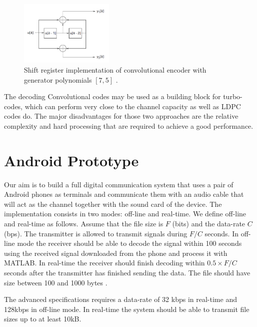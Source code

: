 \documentclass[12pt,a4paper,openright]{report}
\begin{document}
 
  \begin{figure}[H]
   \centering
     \includegraphics[width=0.4\textwidth]{convCode.PNG}
     \caption[Shift register implementation of convolutional encoder]{Shift register implementation of convolutional encoder with generator polynomials $[7,5]$ \cite{Madhow}.}
     \label{fig:convCodeImp}
 \end{figure}  
 
 The decoding 
 Convolutional codes may be used as a building block for turbo-codes, which can perform very close to the channel capacity as well as LDPC codes do. The major disadvantages for those two approaches are the relative complexity and hard processing that are required to achieve a good performance. 





\chapter{Android Prototype}

Our aim is to build a full digital communication system that uses a pair of Android phones as terminals and communicate them with an audio cable that will act as the channel together with the sound card of the device. The implementation consists in two modes: off-line and real-time. We define off-line and real-time as follows. Assume that the file size is $F$ (bits) and the data-rate $C$ (bps). The transmitter is allowed to transmit signals during $F/C$ seconds. In off-line mode the receiver should be able to decode the signal within 100 seconds using the received signal downloaded from the phone and process it with MATLAB. In real-time the receiver should finish decoding within $0.5\times F/C$ seconds after the transmitter has finished sending the data. The file should have size between 100 and 1000 bytes \cite{EQ2440ProjectDescription}.

The advanced specifications requires a data-rate of 32 kbps in real-time and 128kbps in off-line mode. In real-time the system should be able to transmit file sizes up to at least 10kB.
\end{document}

